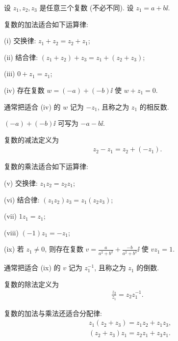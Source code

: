 设 $z_1, z_2, z_3$ 是任意三个复数 (不必不同). 设 $z_1 = a + b \ii$.

\begin{proposition}
    复数的加法适合如下运算律:

    (i) 交换律: $z_1 + z_2 = z_2 + z_1$;

    (ii) 结合律: $(z_1 + z_2) + z_3 = z_1 + (z_2 + z_3)$;

    (iii) $0 + z_1 = z_1$;

    (iv) 存在复数 $w = (-a) + (-b) \ii$ 使 $w + z_1 = 0$.

    通常把适合 (iv) 的 $w$ 记为 $-z_1$, 且称之为 $z_1$ 的相反数.
\end{proposition}

\begin{remark}
    $(-a) + (-b) \ii$ 可写为 $-a-b \ii$.
\end{remark}

\begin{definition}
    复数的减法定义为
    \begin{align*}
        z_2 - z_1 = z_2 + (-z_1).
    \end{align*}
\end{definition}

\begin{proposition}
    复数的乘法适合如下运算律:

    (v) 交换律: $z_1 z_2 = z_2 z_1$;

    (vi) 结合律: $(z_1 z_2) z_3 = z_1 (z_2 z_3)$;

    (vii) $1 z_1 = z_1$;

    (viii) $(-1) z_1 = -z_1$;

    (ix) 若 $z_1 \neq 0$, 则存在复数 $v = \frac{a}{a^2 + b^2} + \frac{-b}{a^2 + b^2} \ii$ 使 $v z_1 = 1$.

    通常把适合 (ix) 的 $v$ 记为 $z_1^{-1}$, 且称之为 $z_1$ 的倒数.
\end{proposition}

\begin{definition}
    复数的除法定义为
    \begin{align*}
        \frac{z_2}{z_1} = z_2 z_1^{-1}.
    \end{align*}
\end{definition}

\begin{proposition}
    复数的加法与乘法还适合分配律:
    \begin{align*}
         & z_1 (z_2 + z_3) = z_1 z_2 + z_1 z_3, \\
         & (z_2 + z_3) z_1 = z_2 z_1 + z_3 z_1.
    \end{align*}
\end{proposition}

